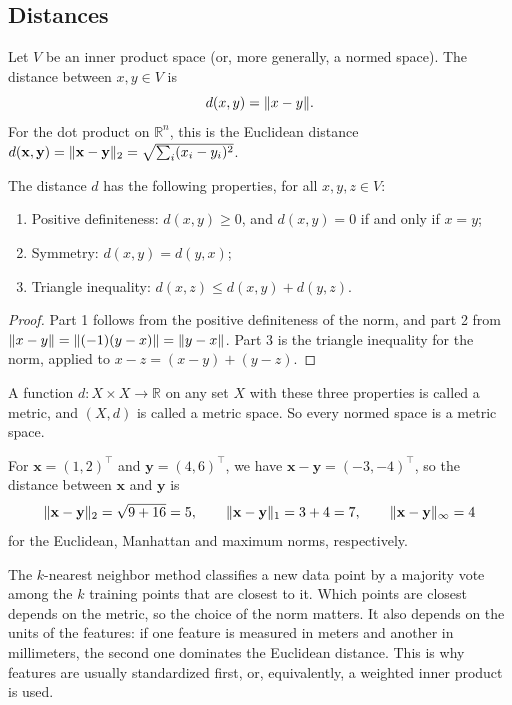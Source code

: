 \subsection{Distances}

\begin{definition}[Distance]
    Let $V$ be an inner product space (or, more generally, a normed space). The distance between $x, y \in V$ is
    \[d(x, y) = \lVert x - y \rVert.\]
    For the dot product on $\mathbb{R}^n$, this is the Euclidean distance $d(\mathbf{x}, \mathbf{y}) = \lVert \mathbf{x} - \mathbf{y} \rVert_2 = \sqrt{\sum_i (x_i - y_i)^2}$.
\end{definition}

\begin{proposition}\label{L2-prop:metric}
    The distance $d$ has the following properties, for all $x, y, z \in V$:
    \begin{enumerate}
        \item Positive definiteness: $d(x, y) \geq 0$, and $d(x, y) = 0$ if and only if $x = y$;
        \item Symmetry: $d(x, y) = d(y, x)$;
        \item Triangle inequality: $d(x, z) \leq d(x, y) + d(y, z)$.
    \end{enumerate}
\end{proposition}

\begin{proof}
    Part 1 follows from the positive definiteness of the norm, and part 2 from $\lVert x - y \rVert = \lVert (-1)(y - x) \rVert = \lVert y - x \rVert$. Part 3 is the triangle inequality for the norm, applied to $x - z = (x - y) + (y - z)$.
\end{proof}

A function $d: X \times X \to \mathbb{R}$ on any set $X$ with these three properties is called a metric, and $(X, d)$ is called a metric space. So every normed space is a metric space.

\begin{example}
    For $\mathbf{x} = (1, 2)^\top$ and $\mathbf{y} = (4, 6)^\top$, we have $\mathbf{x} - \mathbf{y} = (-3, -4)^\top$, so the distance between $\mathbf{x}$ and $\mathbf{y}$ is
    \[\lVert \mathbf{x} - \mathbf{y} \rVert_2 = \sqrt{9 + 16} = 5, \qquad \lVert \mathbf{x} - \mathbf{y} \rVert_1 = 3 + 4 = 7, \qquad \lVert \mathbf{x} - \mathbf{y} \rVert_\infty = 4\]
    for the Euclidean, Manhattan and maximum norms, respectively.
\end{example}

\begin{remark}
    The $k$-nearest neighbor method classifies a new data point by a majority vote among the $k$ training points that are closest to it. Which points are closest depends on the metric, so the choice of the norm matters. It also depends on the units of the features: if one feature is measured in meters and another in millimeters, the second one dominates the Euclidean distance. This is why features are usually standardized first, or, equivalently, a weighted inner product is used.
\end{remark}

